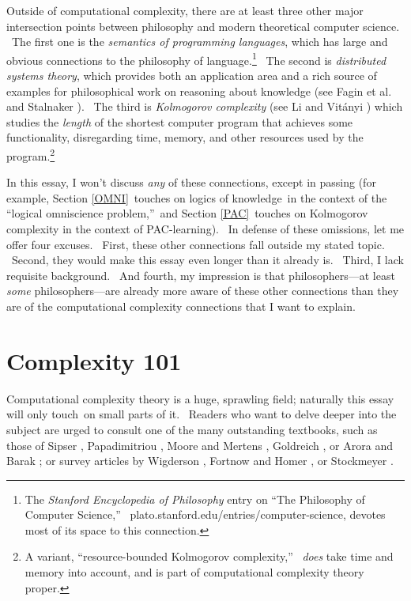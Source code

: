 \documentclass[12pt,onecolumn]{article}%
\begin{document}
Outside of computational complexity, there are at least three other major
intersection points between philosophy and modern theoretical computer
science. \ The first one is the \textit{semantics of programming languages},
which has large and obvious connections to the philosophy of
language.\footnote{The \textit{Stanford Encyclopedia of Philosophy} entry on
\textquotedblleft The Philosophy of Computer Science,\textquotedblright%
\ plato.stanford.edu/entries/computer-science, devotes most of its space to
this connection.} \ The second is \textit{distributed systems theory}, which
provides both an application area and a rich source of examples for
philosophical work on reasoning about knowledge (see Fagin et al.\ \cite{fhmv}
and Stalnaker \cite{stalnaker}). \ The third is \textit{Kolmogorov complexity}
(see Li and Vit\'{a}nyi \cite{livitanyi}) which studies the \textit{length} of
the shortest computer program that achieves some functionality, disregarding
time, memory, and other resources used by the program.\footnote{A variant,
\textquotedblleft resource-bounded Kolmogorov complexity,\textquotedblright%
\ \textit{does} take time and memory into account, and is part of
computational complexity theory proper.}

In this essay, I won't discuss \textit{any} of these connections, except in
passing (for example, Section \ref{OMNI}\ touches on logics of knowledge\ in
the context of the \textquotedblleft logical omniscience
problem,\textquotedblright\ and Section \ref{PAC}\ touches on Kolmogorov
complexity in the context of PAC-learning). \ In defense of these omissions,
let me offer four excuses. \ First, these other connections fall outside my
stated topic. \ Second, they would make this essay even longer than it already
is. \ Third, I lack requisite background. \ And fourth, my impression is that
philosophers---at least \textit{some} philosophers---are already more aware of
these other connections than they are of the computational complexity
connections that I want to explain.

\section{Complexity 101\label{C101}}

Computational complexity theory is a huge, sprawling field; naturally this
essay will only touch\ on small parts of it. \ Readers who want to delve
deeper into the subject are urged to consult one of the many outstanding
textbooks, such as those of Sipser \cite{sipser:book}, Papadimitriou
\cite{papa:book}, Moore and Mertens \cite{mooremertens}, Goldreich
\cite{goldreich:book}, or Arora and Barak \cite{arorabarak}; or survey
articles by Wigderson \cite{wigderson:survey1,wigderson:survey2}, Fortnow and
Homer \cite{fortnowhomer}, or Stockmeyer \cite{stockmeyer:survey}.
\end{document}
